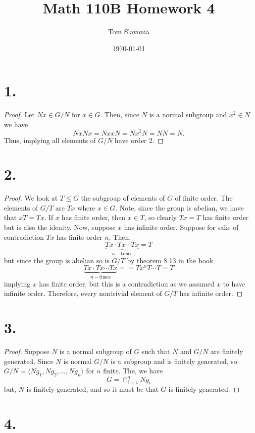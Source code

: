 \documentclass{article}
\title{Math 110B Homework 4}
\author{Tom Slavonia}
\date{\today}
\begin{document}
\maketitle
\section*{1.}
\begin{proof}
    Let $Nx \in G/N$ for $x \in G$. Then, since $N$ is a normal subgroup and $x^2 \in N$ we have
    \[
    NxNx = NxxN = Nx^2N = NN = N.     
    \]
    Thus, implying all elements of $G/N$ have order $2$. 
\end{proof}

\section*{2.}
\begin{proof}
We look at $T \leq G$ the subgroup of elements of $G$ of finite order. The elements of $G/T$ are $Tx$ where $x \in G$. Note, since the group is abelian, we have that $xT = Tx$. If $x$ has finite order, then $x \in T$, so clearly $Tx = T$ has finite order but is also the idenity. Now, suppose $x$ has infinite order. Suppose for sake of contradiction $Tx$ has finite order $n$. Then, 
\[
 \underbrace{Tx \cdot Tx \cdots Tx}_{n-\text{times}} = T   
\]
but since the group is abelian so is $G/T$ by theorem 8.13 in the book
\[
    \underbrace{Tx \cdot Tx \cdots Tx}_{n-\text{times}} = = Tx^nT \cdots T = T 
\]
implying $x$ has finite order, but this is a contradiction as we assumed $x$ to have infinite order. Therefore, every nontrivial element of $G/T$ has infinite order. 
\end{proof}
\section*{3.}
\begin{proof}
    Suppose $N$ is a normal subgroup of $G$ such that $N$ and $G/N$ are finitely generated. Since $N$ is normal $G/N$ is a subgroup and is finitely generated, so $G/N = \langle Ng_1, Ng_2, \ldots, Ng_n \rangle$ for $n$ finite. The, we have 
    \[
    G = \cap_{i = 1}^n Ng_i    
    \]
    but, $N$ is finitely generated, and so it must be that $G$ is finitely generated. 
\end{proof}

\section*{4.}
\end{document}
